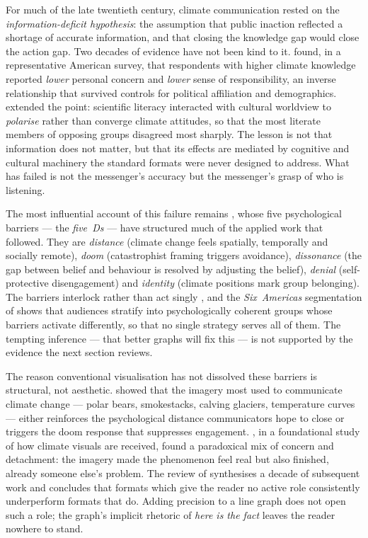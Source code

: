 For much of the late twentieth century, climate communication rested on the \emph{information-deficit hypothesis}: the assumption that public inaction reflected a shortage of accurate information, and that closing the knowledge gap would close the action gap. Two decades of evidence have not been kind to it. \citet{kellstedt2008} found, in a representative American survey, that respondents with higher climate knowledge reported \emph{lower} personal concern and \emph{lower} sense of responsibility, an inverse relationship that survived controls for political affiliation and demographics. \citet{kahan2015} extended the point: scientific literacy interacted with cultural worldview to \emph{polarise} rather than converge climate attitudes, so that the most literate members of opposing groups disagreed most sharply. The lesson is not that information does not matter, but that its effects are mediated by cognitive and cultural machinery the standard formats were never designed to address. What has failed is not the messenger's accuracy but the messenger's grasp of who is listening.

The most influential account of this failure remains \citet{stoknes2015}, whose five psychological barriers --- the \emph{five~Ds} --- have structured much of the applied work that followed. They are \emph{distance} (climate change feels spatially, temporally and socially remote), \emph{doom} (catastrophist framing triggers avoidance), \emph{dissonance} (the gap between belief and behaviour is resolved by adjusting the belief), \emph{denial} (self-protective disengagement) and \emph{identity} (climate positions mark group belonging). The barriers interlock rather than act singly \citep{vanderlinden2015}, and the \emph{Six~Americas} segmentation of \citet{leiserowitz2021} shows that audiences stratify into psychologically coherent groups whose barriers activate differently, so that no single strategy serves all of them. The tempting inference --- that better graphs will fix this --- is not supported by the evidence the next section reviews.

The reason conventional visualisation has not dissolved these barriers is structural, not aesthetic. \citet{cornerclimate2015} showed that the imagery most used to communicate climate change --- polar bears, smokestacks, calving glaciers, temperature curves --- either reinforces the psychological distance communicators hope to close or triggers the doom response that suppresses engagement. \citet{nicholsoncole2005}, in a foundational study of how climate visuals are received, found a paradoxical mix of concern and detachment: the imagery made the phenomenon feel real but also finished, already someone else's problem. The review of \citet{ojala2023} synthesises a decade of subsequent work and concludes that formats which give the reader no active role consistently underperform formats that do. Adding precision to a line graph does not open such a role; the graph's implicit rhetoric of \emph{here is the fact} leaves the reader nowhere to stand.

